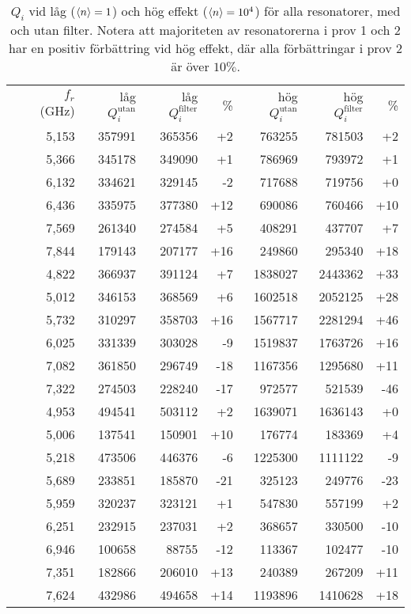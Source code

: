 \documentclass[main.tex]{subfiles}
\begin{document}
\begin{table}[h]
\centering
\caption{$Q_i$ vid låg ($\expval{n}=1$) och hög effekt ($\expval{n}=10^4$) för alla resonatorer, med och utan filter. Notera att majoriteten av resonatorerna i prov 1 och 2 har en positiv förbättring vid hög effekt, där alla förbättringar i prov 2 är över $10 \%$.}
\label{tab:Qi}


\begin{tabular}{crrrrrrr}
\toprule
 & $f_r$ (\unit{GHz}) & låg $Q_i^{\text{utan}}$ & låg $Q_i^{\text{filter}}$ &  \% & hög $Q_i^{\text{utan}}$ & hög $Q_i^{\text{filter}}$ &  \% \\
\cmidrule{2-8}

\parbox[t]{2mm}{}
& 5,153 & 357991 & 365356 & +2 & 763255 & 781503 & +2 \\
 & 5,366 & 345178 & 349090 & +1 & 786969 & 793972 & +1 \\ 
 & 6,132 & 334621 & 329145 & -2 & 717688 & 719756 & +0 \\ 
 & 6,436 & 335975 & 377380 & +12 & 690086 & 760466 & +10 \\ 
 & 7,569 & 261340 & 274584 & +5 & 408291 & 437707 & +7 \\
 & 7,844 & 179143 & 207177 & +16 & 249860 & 295340 & +18\\

\parbox[t]{2mm}{}
& 4,822 & 366937 & 391124 & +7 & 1838027 & 2443362 & +33 \\
& 5,012 & 346153 & 368569 & +6 & 1602518 & 2052125 & +28 \\
& 5,732 & 310297 & 358703 & +16 & 1567717 & 2281294 & +46 \\
& 6,025 & 331339 & 303028 & -9 & 1519837 & 1763726 & +16 \\
& 7,082 & 361850 & 296749 & -18 & 1167356 & 1295680 & +11 \\
& 7,322 & 274503 & 228240 & -17 & 972577 & 521539 & -46 \\

\parbox[t]{2mm}{}
& 4,953 & 494541 & 503112 & +2 & 1639071 & 1636143 & +0 \\
& 5,006 & 137541 & 150901 & +10 & 176774 & 183369 & +4 \\
& 5,218 & 473506 & 446376 & -6 & 1225300 & 1111122 & -9 \\
& 5,689 & 233851 & 185870 & -21 & 325123 & 249776 & -23 \\
& 5,959 & 320237 & 323121 & +1 & 547830 & 557199 & +2 \\
& 6,251 & 232915 & 237031 & +2 & 368657 & 330500 & -10 \\
& 6,946 & 100658 & 88755 & -12 & 113367 & 102477 & -10 \\
& 7,351 & 182866 & 206010 & +13 & 240389 & 267209 & +11 \\
& 7,624 & 432986 & 494658 & +14 & 1193896 & 1410628 & +18\\
\bottomrule
\end{tabular}
\end{table}
\end{document}
